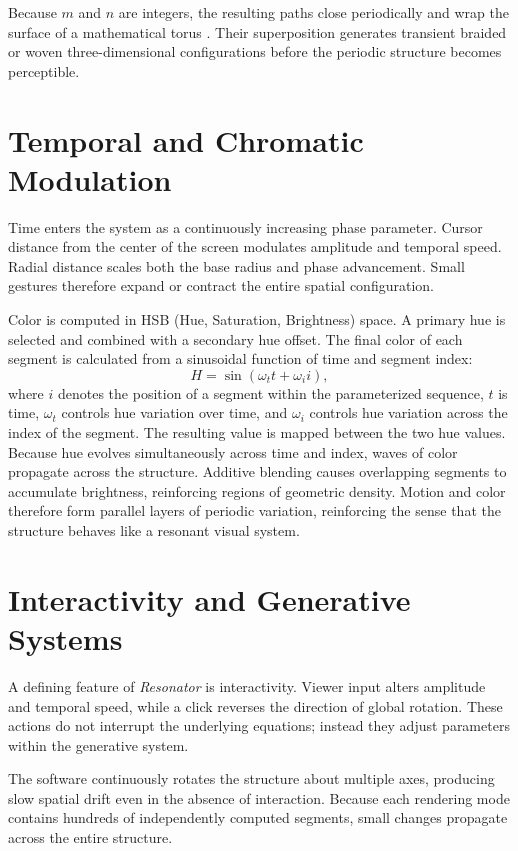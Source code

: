 \documentclass[letterpaper,11pt]{article}
\begin{document}
Because $m$ and $n$ are integers, the resulting paths close periodically and wrap the surface of a mathematical torus \cite{oberti2016torus}. Their superposition generates transient braided or woven three-dimensional configurations before the periodic structure becomes perceptible.

\section*{Temporal and Chromatic Modulation}

Time enters the system as a continuously increasing phase parameter. Cursor distance from the center of the screen modulates amplitude and temporal speed. Radial distance scales both the base radius and phase advancement. Small gestures therefore expand or contract the entire spatial configuration.

Color is computed in HSB (Hue, Saturation, Brightness) space. A primary hue is selected and combined with a secondary hue offset. The final color of each segment is calculated from a sinusoidal function of time and segment index:
\[
H = \sin(\omega_t t + \omega_i i),
\]
where $i$ denotes the position of a segment within the parameterized sequence, $t$ is time, $\omega_t$ controls hue variation over time, and $\omega_i$ controls hue variation across the index of the segment. The resulting value is mapped between the two hue values. Because hue evolves simultaneously across time and index, waves of color propagate across the structure. Additive blending causes overlapping segments to accumulate brightness, reinforcing regions of geometric density. Motion and color therefore form parallel layers of periodic variation, reinforcing the sense that the structure behaves like a resonant visual system.

\section*{Interactivity and Generative Systems}

A defining feature of \emph{Resonator} is interactivity. Viewer input alters amplitude and temporal speed, while a click reverses the direction of global rotation. These actions do not interrupt the underlying equations; instead they adjust parameters within the generative system.

The software continuously rotates the structure about multiple axes, producing slow spatial drift even in the absence of interaction. Because each rendering mode contains hundreds of independently computed segments, small changes propagate across the entire structure.
\end{document}
